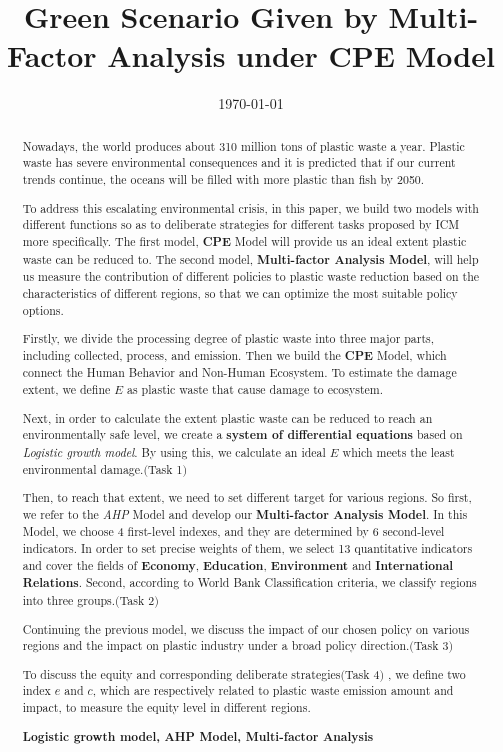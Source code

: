 \documentclass{mcmthesis}
\begin{document}
\linespread{0.6} %
\setlength{\parskip}{0.5\baselineskip} %
\title{Green Scenario Given by Multi-Factor Analysis under CPE Model}%

\date{\today}
	\begin{abstract}%

		Nowadays, the world produces about 310 million tons of plastic waste a year. Plastic waste has severe environmental consequences and it is predicted that if our current trends continue, the oceans will be filled with more plastic than fish by 2050.

		To address this escalating environmental crisis, in this paper, we build two models with different functions so as to deliberate strategies for different tasks proposed by ICM more specifically. The first model, \textbf{CPE} Model will provide us an ideal extent plastic waste can be reduced to. The second model,\textbf{ Multi-factor Analysis Model}, will help us measure the contribution of different policies to plastic waste reduction based on the characteristics of different regions, so that we can optimize the most suitable policy options.

		Firstly, we divide the processing degree of plastic waste into three major parts, including collected, process, and emission. Then we build the \textbf{CPE} Model, which connect the Human Behavior and Non-Human Ecosystem. To estimate the damage extent, we define $E$ as plastic waste that cause damage to ecosystem. 
		
		Next, in order to calculate the extent plastic waste can be reduced to reach an environmentally safe level, we create a \textbf{system of differential equations} based on \textit{Logistic growth model}. By using this, we calculate an ideal $E$ which meets the least environmental damage.$($Task 1$)$
		
		Then, to reach that extent, we need to set different target for various regions. So first, we refer to the \textit{AHP} Model and develop our \textbf{ Multi-factor Analysis Model}. In this Model, we choose 4 first-level indexes, and they are determined by 6 second-level indicators. In order to set precise weights of them, we  select 13 quantitative indicators and cover the fields of \textbf{Economy}, \textbf{Education}, \textbf{Environment} and \textbf{International Relations}. Second, according to World Bank Classification criteria, we classify regions into three groups.$($Task 2$)$
		
		Continuing the previous model, we discuss the impact of our chosen policy on various regions and the impact on plastic industry under a broad policy direction.$($Task 3$)$

        To discuss the equity and corresponding deliberate strategies$($Task 4$)$
		, we define two index $e$ and $c$, which are respectively related to plastic waste emission amount and impact, to measure the equity level in different regions.  
	   \begin{keywords}
		\textbf{Logistic growth model, AHP Model, Multi-factor Analysis}%
		\end{keywords}
		
	\end{abstract}
\end{document}
